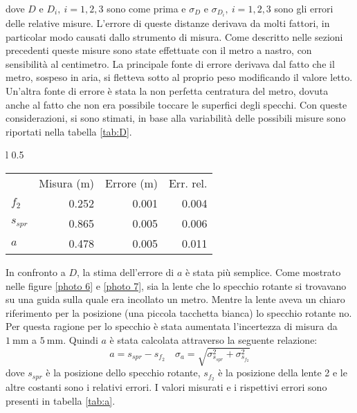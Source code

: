 \documentclass[a4paper,11pt]{article}
\begin{document}
	dove $ D $ e $ D_i, \ i=1,2,3 $ sono come prima e $ \sigma_D $ e $ \sigma_{D_i}, \ i=1,2,3 $ sono gli errori delle relative misure. L'errore di queste distanze derivava da molti fattori, in particolar modo causati dallo strumento di misura. Come descritto nelle sezioni precedenti queste misure sono state effettuate con il metro a nastro, con sensibilità al centimetro. La principale fonte di errore derivava dal fatto che il metro, sospeso in aria, si fletteva sotto al proprio peso modificando il valore letto. Un'altra fonte di errore è stata la non perfetta centratura del metro, dovuta anche al fatto che non era possibile toccare le superfici degli specchi.
	Con queste considerazioni, si sono stimati, in base alla variabilità delle possibili misure sono riportati nella tabella \ref{tab:D}.
	
	\begin{wraptable}{l} {0.5 \textwidth}
		\centering
		\caption{Misura di $ a $}
		\vspace{0.1cm}
		\begin{tabular}{lrrr}
			\rowcolor[rgb]{ .741,  .843,  .933}       & \multicolumn{1}{l}{Misura (\si{\meter})} & \multicolumn{1}{l}{Errore (\si{\meter})} & \multicolumn{1}{l}{Err. rel.} \\
			\rowcolor[rgb]{ .741,  .843,  .933} $f_2$ & \cellcolor[rgb]{ .859,  .859,  .859} 0.252 & \cellcolor[rgb]{ .859,  .859,  .859} 0.001 & \cellcolor[rgb]{ .859,  .859,  .859} 0.004 \\
			\rowcolor[rgb]{ .741,  .843,  .933} $s_{spr}$ & \cellcolor[rgb]{ .929,  .929,  .929} 0.865 & \cellcolor[rgb]{ .929,  .929,  .929} 0.005 & \cellcolor[rgb]{ .929,  .929,  .929} 0.006 \\
			\rowcolor[rgb]{ .741,  .843,  .933} $a$   & \cellcolor[rgb]{ .859,  .859,  .859} 0.478 & \cellcolor[rgb]{ .859,  .859,  .859} 0.005 & \cellcolor[rgb]{ .859,  .859,  .859} 0.011 \\
		\end{tabular}%
		\label{tab:a}%
	\end{wraptable}%
	
	
	In confronto a $ D $, la stima dell'errore di $ a $ è stata più semplice. Come mostrato nelle figure \ref{photo 6} e \ref{photo 7}, sia la lente che lo specchio rotante si trovavano su una guida sulla quale era incollato un metro. Mentre la lente aveva un chiaro riferimento per la posizione (una piccola tacchetta bianca) lo specchio rotante no. Per questa ragione per lo specchio è stata aumentata l'incertezza di misura da $ \SI{1}{\milli\meter} $ a $ \SI{5}{\milli\meter} $. Quindi $ a $ è stata calcolata attraverso la seguente relazione:
	\begin{equation}\label{eqn:a}
		a = s_{spr} - s_{f_2} \quad \sigma_a = \sqrt{ \sigma_{s_{spr}}^2+\sigma_{s_{f_2}}^2}
	\end{equation}
	dove $ s_{spr} $ è la posizione dello specchio rotante, $ s_{f_2} $ è la posizione della lente 2 e le altre costanti sono i relativi errori. I valori misurati e i rispettivi errori sono presenti in tabella \ref{tab:a}.
	
\end{document}
